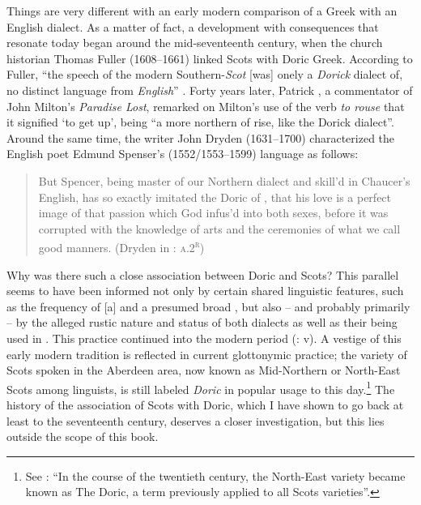 Things are very different with an early modern comparison of a Greek with an English dialect. As a matter of fact, a development with consequences that resonate today began around the mid-seventeenth century, when the church historian Thomas Fuller (1608–1661) linked Scots with Doric Greek. According to Fuller, “the speech of the modern Southern-\textit{Scot} [was] onely a \textit{Dorick} dialect of, no distinct language from \textit{English}” \citep[81]{Fuller1655}. Forty years later, Patrick \citet[20]{Hume1695}, a commentator of John Milton’s \textit{Paradise Lost}, remarked on Milton’s use of the verb \textit{to rouse} that it signified ‘to get up’, being “a more northern  of rise, like the Dorick dialect”. Around the same time, the writer John Dryden (1631–1700) characterized the English poet Edmund Spenser’s (1552/1553–1599) language as follows:

\begin{quote}
But Spencer, being master of our Northern dialect and skill’d in Chaucer’s English, has so exactly imitated the Doric of , that his love is a perfect image of that passion which God infus’d into both sexes, before it was corrupted with the knowledge of arts and the ceremonies of what we call good manners. (Dryden in \citealt{Virgil1697}: \textsc{a.2}\textsc{\textsuperscript{r}})
\end{quote}

Why was there such a close association between Doric and Scots? This parallel seems to have been informed not only by certain shared linguistic features, such as the frequency of [a] and a presumed broad , but also – and probably primarily – by the alleged rustic nature and status of both dialects as well as their being used in . This practice continued into the modern period (\citealt{Colvin1999}: v). A vestige of this early modern tradition is reflected in current glottonymic practice; the variety of Scots spoken in the Aberdeen area, now known as Mid-Northern or North-East Scots among linguists, is still labeled \textit{Doric} in popular usage to this day.\footnote{See \citet[116]{Mccoll2007}: “In the course of the twentieth century, the North-East variety became known as The Doric, a term previously applied to all Scots varieties”.} The history of the association of Scots with Doric, which I have shown to go back at least to the seventeenth century, deserves a closer investigation, but this lies outside the scope of this book.

